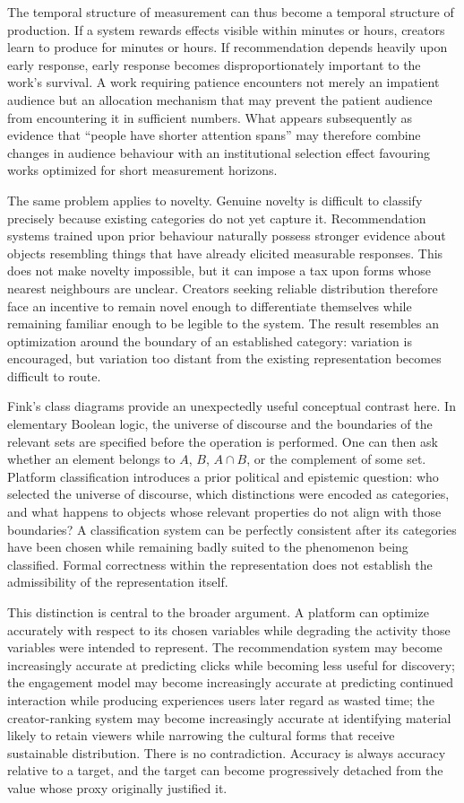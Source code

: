 \documentclass[11pt]{article}
\begin{document}
The temporal structure of measurement can thus become a temporal structure of production. If a system rewards effects visible within minutes or hours, creators learn to produce for minutes or hours. If recommendation depends heavily upon early response, early response becomes disproportionately important to the work's survival. A work requiring patience encounters not merely an impatient audience but an allocation mechanism that may prevent the patient audience from encountering it in sufficient numbers. What appears subsequently as evidence that ``people have shorter attention spans'' may therefore combine changes in audience behaviour with an institutional selection effect favouring works optimized for short measurement horizons.

The same problem applies to novelty. Genuine novelty is difficult to classify precisely because existing categories do not yet capture it. Recommendation systems trained upon prior behaviour naturally possess stronger evidence about objects resembling things that have already elicited measurable responses. This does not make novelty impossible, but it can impose a tax upon forms whose nearest neighbours are unclear. Creators seeking reliable distribution therefore face an incentive to remain novel enough to differentiate themselves while remaining familiar enough to be legible to the system. The result resembles an optimization around the boundary of an established category: variation is encouraged, but variation too distant from the existing representation becomes difficult to route.

Fink's class diagrams provide an unexpectedly useful conceptual contrast here. In elementary Boolean logic, the universe of discourse and the boundaries of the relevant sets are specified before the operation is performed. One can then ask whether an element belongs to \(A\), \(B\), \(A \cap B\), or the complement of some set. Platform classification introduces a prior political and epistemic question: who selected the universe of discourse, which distinctions were encoded as categories, and what happens to objects whose relevant properties do not align with those boundaries? A classification system can be perfectly consistent after its categories have been chosen while remaining badly suited to the phenomenon being classified. Formal correctness within the representation does not establish the admissibility of the representation itself.

This distinction is central to the broader argument. A platform can optimize accurately with respect to its chosen variables while degrading the activity those variables were intended to represent. The recommendation system may become increasingly accurate at predicting clicks while becoming less useful for discovery; the engagement model may become increasingly accurate at predicting continued interaction while producing experiences users later regard as wasted time; the creator-ranking system may become increasingly accurate at identifying material likely to retain viewers while narrowing the cultural forms that receive sustainable distribution. There is no contradiction. Accuracy is always accuracy relative to a target, and the target can become progressively detached from the value whose proxy originally justified it.
\end{document}
